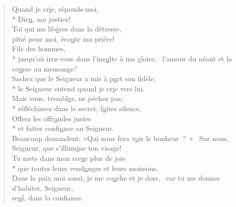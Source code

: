 
\begin{verse}
Quand je cr\underline{i}e, réponds-moi, \\*
Die\underline{u}, ma justice! \\

Toi qui me lib\underline{è}res dans la détresse, \\
pitié pour moi, éco\underline{u}te ma prière! \\

Fils des hommes, \\*
jusqu’où irez-vous dans l’ins\underline{u}lte à ma gloire,~\psalmstar
l’amour du néant et la co\underline{u}rse au mensonge? \\

Sachez que le Seigneur a mis à p\underline{a}rt son fidèle, \\*
le Seigneur entend quand je cr\underline{i}e vers lui. \\

Mais vous, trembl\underline{e}z, ne péchez pas; \\*
réfléchissez dans le secret, f\underline{a}ites silence. \\

Offrez les offr\underline{a}ndes justes \\*
et faites confi\underline{a}nce au Seigneur. \\

Beaucoup demandent:
«Qui nous fera v\underline{o}ir le bonheur ? »~\psalmstar
Sur nous, Seigneur, que s’illum\underline{i}ne ton visage! \\

Tu mets dans mon cœ\underline{u}r plus de joie \\*
que toutes leurs vend\underline{a}nges et leurs moissons. \\

Dans la paix moi aussi, je me co\underline{u}che et je dors,~\psalmstar
car tu me donnes d’habiter, Seigneur, \\
se\underline{u}l, dans la confiance. \\
\end{verse}

